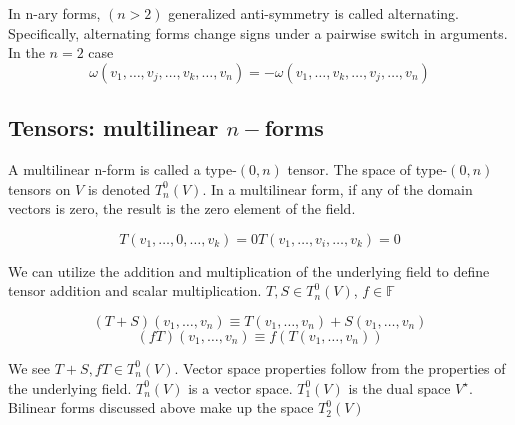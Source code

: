 \documentclass[a4paper]{scrartcl}
\begin{document}
In n-ary forms, $(n>2)$ generalized anti-symmetry is called alternating. Specifically, alternating forms change signs under a pairwise switch in arguments. In the $n=2$ case 
$$\omega(v_{1}, \ldots, v_{j}, \ldots, v_{k},\ldots, v_{n}) = 
-\omega(v_{1}, \ldots, v_{k}, \ldots, v_{j},\ldots, v_{n}) $$

\subsection{Tensors: multilinear $n-$forms}
A multilinear n-form is called a type-$(0,n)$ tensor. The space of type-$(0,n)$ tensors on $V$ is denoted $T_{n}^0(V)$. In a multilinear form, if any of the domain vectors is zero, the result is the zero element of the field.

$$T(v_{1},\ldots,0,\ldots,v_{k}) = 0 T(v_{1},\ldots,v_{i},\ldots,v_{k}) = 0$$

We can utilize the addition and multiplication of the underlying field to define tensor addition and scalar multiplication. $T, S \in T_{n}^0(V)$, $f\in \mathbb{F}$

$$(T+S)(v_{1},\ldots,v_{n}) \equiv T(v_{1},\ldots,v_{n}) + S(v_{1},\ldots,v_{n})$$
$$(fT)(v_{1},\ldots,v_{n}) \equiv f(T(v_{1},\ldots,v_{n}))$$

We see $T+S, fT \in T_{n}^0(V)$. Vector space properties follow from the properties of the underlying field. $T_{n}^0(V)$ is a vector space. $T_{1}^{0}(V)$ is the dual space $V^{\star}$. Bilinear forms discussed above make up the space $T_{2}^0(V)$
\end{document}
